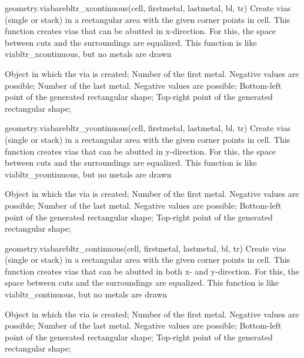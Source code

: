 \begin{APIfunc}{geometry.viabarebltr\_xcontinuous(cell, firstmetal, lastmetal, bl, tr)}
    Create vias (single or stack) in a rectangular area with the given corner points in cell. This function creates vias that can be abutted in x-direction. For this, the space between cuts and the surroundings are equalized. This function is like viabltr\_xcontinuous, but no metals are drawn
    \begin{APIparameters}
            Object in which the via is created;
            Number of the first metal. Negative values are possible;
            Number of the last metal. Negative values are possible;
            Bottom-left point of the generated rectangular shape;
            Top-right point of the generated rectangular shape;
    \end{APIparameters}
\end{APIfunc}
\begin{APIfunc}{geometry.viabarebltr\_ycontinuous(cell, firstmetal, lastmetal, bl, tr)}
    Create vias (single or stack) in a rectangular area with the given corner points in cell. This function creates vias that can be abutted in y-direction. For this, the space between cuts and the surroundings are equalized. This function is like viabltr\_ycontinuous, but no metals are drawn
    \begin{APIparameters}
            Object in which the via is created;
            Number of the first metal. Negative values are possible;
            Number of the last metal. Negative values are possible;
            Bottom-left point of the generated rectangular shape;
            Top-right point of the generated rectangular shape;
    \end{APIparameters}
\end{APIfunc}
\begin{APIfunc}{geometry.viabarebltr\_continuous(cell, firstmetal, lastmetal, bl, tr)}
    Create vias (single or stack) in a rectangular area with the given corner points in cell. This function creates vias that can be abutted in both x- and y-direction. For this, the space between cuts and the surroundings are equalized. This function is like viabltr\_continuous, but no metals are drawn
    \begin{APIparameters}
            Object in which the via is created;
            Number of the first metal. Negative values are possible;
            Number of the last metal. Negative values are possible;
            Bottom-left point of the generated rectangular shape;
            Top-right point of the generated rectangular shape;
    \end{APIparameters}
\end{APIfunc}
